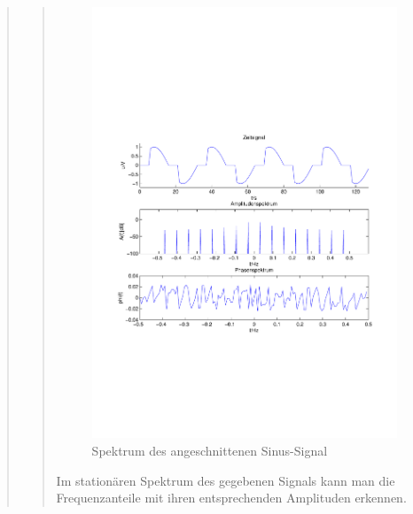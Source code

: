 \begin{quote}
\begin{quote}
        
        \begin{figure}[H]
                    \centering
                        \includegraphics[scale=0.5, trim = 1cm 7cm 1.5cm 8cm,
                        clip]{./Bilder/Termin8/Spektrum}
                        \caption{Spektrum des angeschnittenen Sinus-Signal}
                    \end{figure} 
        
        
        Im stationären Spektrum des gegebenen Signals kann man die
        Frequenzanteile mit ihren entsprechenden Amplituden erkennen.
        

\end{quote}
\end{quote}
